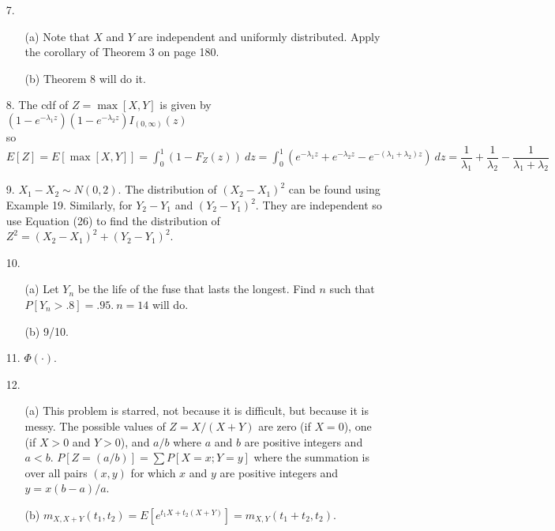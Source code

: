 \begin{enumerate}
	\item[7.] \begin{enumerate}
		\item[(a)] Note that $X$ and $Y$ are independent and uniformly distributed. Apply the corollary of Theorem 3 on page 180.
		\item[(b)] Theorem 8 will do it.
	\end{enumerate}
	
	\item[8.] The cdf of $Z=\max[X,Y]$ is given by \\
			$(1-e^{-\lambda_1z})(1-e^{-\lambda_2z})I_{(0,\infty)}(z)$ \\
			so $\displaystyle E[Z] = E[\max[X,Y]] = \int_0^1 (1-F_Z(z))\ dz = \int_{0}^{1} \left(e^{-\lambda_1z}+e^{-\lambda_2z}-e^{-(\lambda_1+\lambda_2)z}\right)\ dz = \dfrac{1}{\lambda_1} + \dfrac{1}{\lambda_2} - \dfrac{1}{\lambda_1+\lambda_2}$ 
		
	\item[9.] $X_1-X_2\sim N(0,2)$. The distribution of $(X_2-X_1)^2$ can be found using Example 19.  Similarly, for $Y_2-Y_1$ and $(Y_2-Y_1)^2$.   They are independent so use Equation (26) to find the distribution of $Z^2 = (X_2-X_1)^2 + (Y_2-Y_1)^2$.
	
	\item[10.] \begin{enumerate}
		\item[(a)] Let $Y_n$ be the life of the fuse that lasts the longest. Find $n$ such that $P[Y_n> .8]=.95.\ n=14$ will do.
		\item[(b)] 9/10.
	\end{enumerate}
	
	\item[11.] $\Phi(\cdot)$.
	
	\item[12.] \begin{enumerate}
		\item[(a)] This problem is starred, not because it is difficult, but because it is messy. The possible values of $Z=X/(X+Y)$ are zero (if $X=0$), one (if $X>0$ and $Y>0$), and $a/b$ where $a$ and $b$ are positive integers and $a<b$. $P[Z = (a/b)] = \sum P[X=x; Y=y]$ where the summation is over all pairs $(x,y)$ for which $x$ and $y$ are positive integers and $y=x(b-a)/a$.
		\item[(b)] $m_{X,X+Y}(t_1,t_2) = E[e^{t_1X+t_2(X+Y)}] = m_{X,Y}(t_1+t_2, t_2).$
	\end{enumerate}


\end{enumerate}
